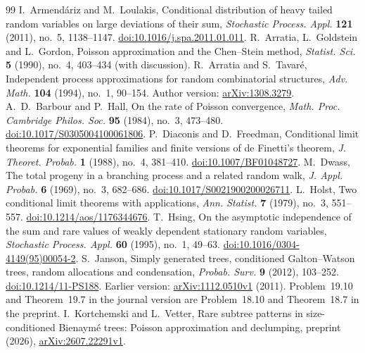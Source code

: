 \begin{thebibliography}{99}
 I.~Armend\'ariz and M.~Loulakis, Conditional distribution of heavy tailed random variables on large deviations of their sum, \emph{Stochastic Process. Appl.} \textbf{121} (2011), no.~5, 1138--1147. \href{https://doi.org/10.1016/j.spa.2011.01.011}{doi:10.1016/j.spa.2011.01.011}.
 R.~Arratia, L.~Goldstein and L.~Gordon, Poisson approximation and the Chen--Stein method, \emph{Statist. Sci.} \textbf{5} (1990), no.~4, 403--434 (with discussion).
 R.~Arratia and S.~Tavar\'e, Independent process approximations for random combinatorial structures, \emph{Adv. Math.} \textbf{104} (1994), no.~1, 90--154. Author version: \href{https://arxiv.org/abs/1308.3279}{arXiv:1308.3279}.
 A.~D.~Barbour and P.~Hall, On the rate of Poisson convergence, \emph{Math. Proc. Cambridge Philos. Soc.} \textbf{95} (1984), no.~3, 473--480. \href{https://doi.org/10.1017/S0305004100061806}{doi:10.1017/S0305004100061806}.
 P.~Diaconis and D.~Freedman, Conditional limit theorems for exponential families and finite versions of de Finetti's theorem, \emph{J. Theoret. Probab.} \textbf{1} (1988), no.~4, 381--410. \href{https://doi.org/10.1007/BF01048727}{doi:10.1007/BF01048727}.
 M.~Dwass, The total progeny in a branching process and a related random walk, \emph{J. Appl. Probab.} \textbf{6} (1969), no.~3, 682--686. \href{https://doi.org/10.1017/S0021900200026711}{doi:10.1017/S0021900200026711}.
 L.~Holst, Two conditional limit theorems with applications, \emph{Ann. Statist.} \textbf{7} (1979), no.~3, 551--557. \href{https://doi.org/10.1214/aos/1176344676}{doi:10.1214/aos/1176344676}.
 T.~Hsing, On the asymptotic independence of the sum and rare values of weakly dependent stationary random variables, \emph{Stochastic Process. Appl.} \textbf{60} (1995), no.~1, 49--63. \href{https://doi.org/10.1016/0304-4149(95)00054-2}{doi:10.1016/0304-4149(95)00054-2}.
 S.~Janson, Simply generated trees, conditioned Galton--Watson trees, random allocations and condensation, \emph{Probab. Surv.} \textbf{9} (2012), 103--252. \href{https://doi.org/10.1214/11-PS188}{doi:10.1214/11-PS188}. Earlier version: \href{https://arxiv.org/abs/1112.0510v1}{arXiv:1112.0510v1} (2011). Problem~19.10 and Theorem~19.7 in the journal version are Problem~18.10 and Theorem~18.7 in the preprint.
 I.~Kortchemski and L.~Vetter, Rare subtree patterns in size-conditioned Bienaym\'e trees: Poisson approximation and declumping, preprint (2026), \href{https://arxiv.org/abs/2607.22291}{arXiv:2607.22291v1}.

\end{thebibliography}
